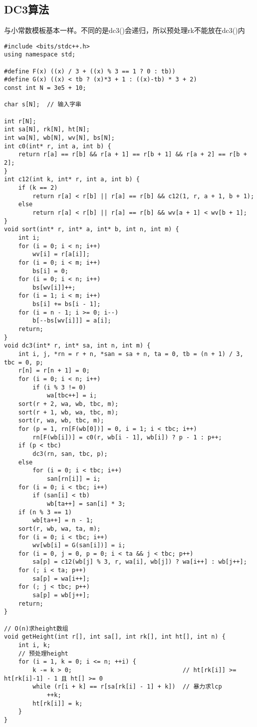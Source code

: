     \subsection{DC3算法}
        与小常数模板基本一样。不同的是dc3()会递归，所以预处理rk不能放在dc3()内
\begin{lstlisting}
#include <bits/stdc++.h>
using namespace std;

#define F(x) ((x) / 3 + ((x) % 3 == 1 ? 0 : tb))
#define G(x) ((x) < tb ? (x)*3 + 1 : ((x)-tb) * 3 + 2)
const int N = 3e5 + 10;

char s[N];  // 输入字串

int r[N];
int sa[N], rk[N], ht[N];
int wa[N], wb[N], wv[N], bs[N];
int c0(int* r, int a, int b) {
    return r[a] == r[b] && r[a + 1] == r[b + 1] && r[a + 2] == r[b + 2];
}
int c12(int k, int* r, int a, int b) {
    if (k == 2)
        return r[a] < r[b] || r[a] == r[b] && c12(1, r, a + 1, b + 1);
    else
        return r[a] < r[b] || r[a] == r[b] && wv[a + 1] < wv[b + 1];
}
void sort(int* r, int* a, int* b, int n, int m) {
    int i;
    for (i = 0; i < n; i++)
        wv[i] = r[a[i]];
    for (i = 0; i < m; i++)
        bs[i] = 0;
    for (i = 0; i < n; i++)
        bs[wv[i]]++;
    for (i = 1; i < m; i++)
        bs[i] += bs[i - 1];
    for (i = n - 1; i >= 0; i--)
        b[--bs[wv[i]]] = a[i];
    return;
}
void dc3(int* r, int* sa, int n, int m) {
    int i, j, *rn = r + n, *san = sa + n, ta = 0, tb = (n + 1) / 3, tbc = 0, p;
    r[n] = r[n + 1] = 0;
    for (i = 0; i < n; i++)
        if (i % 3 != 0)
            wa[tbc++] = i;
    sort(r + 2, wa, wb, tbc, m);
    sort(r + 1, wb, wa, tbc, m);
    sort(r, wa, wb, tbc, m);
    for (p = 1, rn[F(wb[0])] = 0, i = 1; i < tbc; i++)
        rn[F(wb[i])] = c0(r, wb[i - 1], wb[i]) ? p - 1 : p++;
    if (p < tbc)
        dc3(rn, san, tbc, p);
    else
        for (i = 0; i < tbc; i++)
            san[rn[i]] = i;
    for (i = 0; i < tbc; i++)
        if (san[i] < tb)
            wb[ta++] = san[i] * 3;
    if (n % 3 == 1)
        wb[ta++] = n - 1;
    sort(r, wb, wa, ta, m);
    for (i = 0; i < tbc; i++)
        wv[wb[i] = G(san[i])] = i;
    for (i = 0, j = 0, p = 0; i < ta && j < tbc; p++)
        sa[p] = c12(wb[j] % 3, r, wa[i], wb[j]) ? wa[i++] : wb[j++];
    for (; i < ta; p++)
        sa[p] = wa[i++];
    for (; j < tbc; p++)
        sa[p] = wb[j++];
    return;
}

// O(n)求height数组
void getHeight(int r[], int sa[], int rk[], int ht[], int n) {
    int i, k;
    // 预处理height
    for (i = 1, k = 0; i <= n; ++i) {
        k -= k > 0;                               // ht[rk[i]] >= ht[rk[i]-1] - 1 且 ht[] >= 0
        while (r[i + k] == r[sa[rk[i] - 1] + k])  // 暴力求lcp
            ++k;
        ht[rk[i]] = k;
    }
}


\end{lstlisting}
